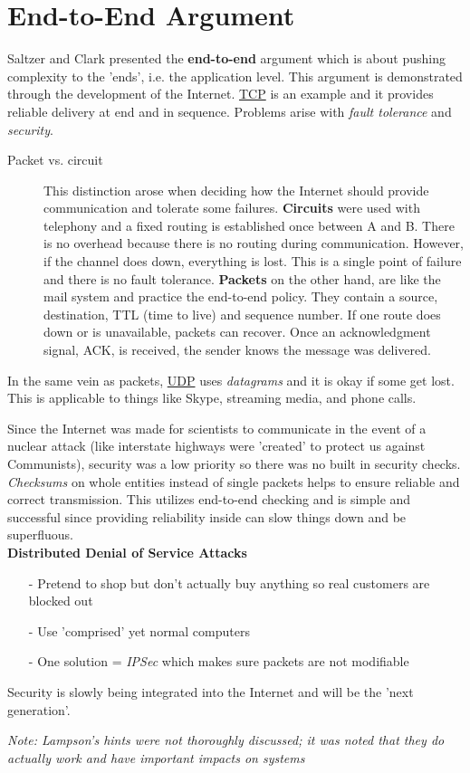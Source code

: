\documentclass[twoside]{article}
\begin{document}
\section{End-to-End Argument}
Saltzer and Clark presented the \textbf{end-to-end} argument which is about pushing complexity to the 'ends', i.e. the application level. This argument is demonstrated through the development of the Internet. \underline{TCP} is an example and it provides reliable delivery at end and in sequence. Problems arise with \emph{fault tolerance} and \emph{security}. 
\begin{description}
\item[Packet vs. circuit] This distinction arose when deciding how the Internet should provide communication and tolerate some failures. \textbf{Circuits} were used with telephony and a fixed routing is established once between A and B. There is no overhead because there is no routing during communication. However, if the channel does down, everything is lost. This is a single point of failure and there is no fault tolerance. \textbf{Packets} on the other hand, are like the mail system and practice the end-to-end policy. They contain a source, destination, TTL (time to live) and sequence number. If one route does down or is unavailable, packets can recover. Once an acknowledgment signal, ACK, is received, the sender knows the message was delivered. 
\end{description}
In the same vein as packets, \underline{UDP} uses \emph{datagrams} and it is okay if some get lost. This is applicable to things like Skype, streaming media, and phone calls. 

Since the Internet was made for scientists to communicate in the event of a nuclear attack (like interstate highways were 'created' to protect us against Communists), security was a low priority so there was no built in security checks. \emph{Checksums} on whole entities instead of single packets helps to ensure reliable and correct transmission. This utilizes end-to-end checking and is simple and successful since providing reliability inside can slow things down and be superfluous. \\

{\normalsize \textbf{Distributed Denial of Service Attacks}}
\begin{itemize}
\item[-] Pretend to shop but don't actually buy anything so real customers are blocked out
\item[-] Use 'comprised' yet normal computers
\item[-] One solution = \emph{IPSec} which makes sure packets are not modifiable 
\end{itemize}

Security is slowly being integrated into the Internet and will be the 'next generation'.

\emph{Note: Lampson's hints were not thoroughly discussed; it was noted that they do actually work and have important impacts on systems} 
\end{document}
